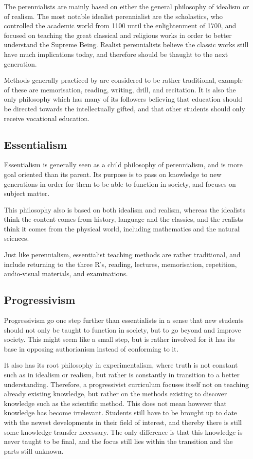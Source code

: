 The perennialists are mainly based on either the general philosophy of idealism or of realism. The most notable idealist perennialist are the scholastics, who controlled the academic world from 1100 until the enlightenment of 1700, and focused on teaching the great classical and religious works in order to better understand the Supreme Being. Realist perennialists believe the classic works still have much implications today, and therefore should be thaught to the next generation.

Methods generally practiced by are considered to be rather traditional, example of these are memorisation, reading, writing, drill, and recitation. It is also the only philosophy which has many of its followers believing that education should be directed towards the intellectually gifted, and that other students should only receive vocational education.

\subsection{Essentialism}

Essentialism is generally seen as a child philosophy of perennialism, and is more goal oriented than its parent. Its purpose is to pass on knowledge to new generations in order for them to be able to function in society, and focuses on subject matter.

This philosophy also is based on both idealism and realism, whereas the idealists think the content comes from history, language and the classics, and the realists think it comes from the physical world, including mathematics and the natural sciences.

Just like perennialism, essentialist teaching methods are rather traditional, and include returning to the three R's, reading, lectures, memorisation, repetition, audio-visual materials, and examinations.

\subsection{Progressivism}

Progressivism go one step further than essentialists in a sense that new students should not only be taught to function in society, but to go beyond and improve society. This might seem like a small step, but is rather involved for it has its base in opposing authorianism instead of conforming to it.

It also has its root philosophy in experimentalism, where truth is not constant such as in idealism or realism, but rather is constantly in transition to a better understanding. Therefore, a progressivist curriculum focuses itself not on teaching already existing knowledge, but rather on the methods existing to discover knowledge such as the scientific method. This does not mean however that knowledge has become irrelevant. Students still have to be brought up to date with the newest developments in their field of interest, and thereby there is still some knowledge transfer necessary. The only difference is that this knowledge is never taught to be final, and the focus still lies within the transition and the parts still unknown.

